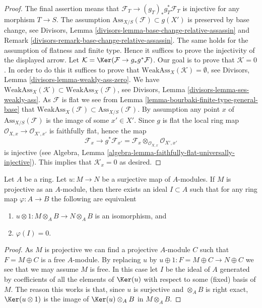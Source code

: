 \begin{proof}
The final assertion means that $\mathcal{F}_T \to (g_T)_*g_T^*\mathcal{F}_T$
is injective for any morphism $T \to S$. The assumption
$\text{Ass}_{X/S}(\mathcal{F}) \subset g(X')$ is preserved by base change, see
Divisors, Lemma \ref{divisors-lemma-base-change-relative-assassin} and
Remark \ref{divisors-remark-base-change-relative-assassin}.
The same holds for the assumption of flatness and finite type.
Hence it suffices to prove the injectivity of the displayed arrow.
Let $\mathcal{K} = \Ker(\mathcal{F} \to g_*g^*\mathcal{F})$.
Our goal is to prove that $\mathcal{K} = 0$.
In order to do this it suffices to prove that
$\text{WeakAss}_X(\mathcal{K}) = \emptyset$, see
Divisors, Lemma \ref{divisors-lemma-weakly-ass-zero}.
We have
$\text{WeakAss}_X(\mathcal{K}) \subset \text{WeakAss}_X(\mathcal{F})$, see
Divisors, Lemma \ref{divisors-lemma-ses-weakly-ass}.
As $\mathcal{F}$ is flat we see from
Lemma \ref{lemma-bourbaki-finite-type-general-base}
that $\text{WeakAss}_X(\mathcal{F}) \subset \text{Ass}_{X/S}(\mathcal{F})$.
By assumption any point $x$ of $\text{Ass}_{X/S}(\mathcal{F})$
is the image of some $x' \in X'$. Since $g$ is flat the
local ring map $\mathcal{O}_{X, x} \to \mathcal{O}_{X', x'}$
is faithfully flat, hence the map
$$
\mathcal{F}_x
\longrightarrow
g^*\mathcal{F}_{x'} =
\mathcal{F}_x \otimes_{\mathcal{O}_{X, x}} \mathcal{O}_{X', x'}
$$
is injective (see
Algebra, Lemma \ref{algebra-lemma-faithfully-flat-universally-injective}).
This implies that $\mathcal{K}_x = 0$ as desired.
\end{proof}

\begin{lemma}
\label{lemma-flattening-module-map}
Let $A$ be a ring. Let $u : M \to N$ be a surjective map of $A$-modules.
If $M$ is projective as an $A$-module, then there exists an ideal
$I \subset A$ such that for any ring map $\varphi : A \to B$
the following are equivalent
\begin{enumerate}
\item $u \otimes 1 : M \otimes_A B \to N \otimes_A B$ is an
isomorphism, and
\item $\varphi(I) = 0$.
\end{enumerate}
\end{lemma}

\begin{proof}
As $M$ is projective we can find a projective $A$-module $C$
such that $F = M \oplus C$ is a free $A$-module.
By replacing $u$ by $u \oplus 1 : F = M \oplus C \to N \oplus C$
we see that we may assume $M$ is free. In this case let $I$ be
the ideal of $A$ generated by coefficients of all the elements of
$\Ker(u)$ with respect to some (fixed) basis of $M$.
The reason this works is that, since $u$ is surjective and
$\otimes_A B$ is right exact, $\Ker(u \otimes 1)$ is
the image of $\Ker(u) \otimes_A B$ in $M \otimes_A B$.
\end{proof}

